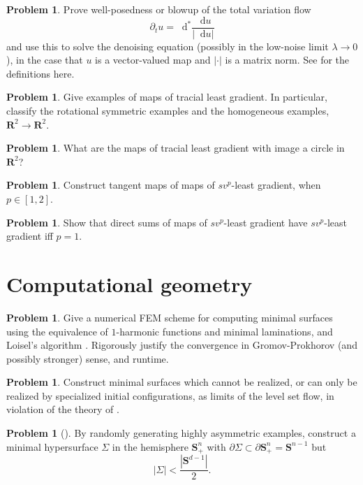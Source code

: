 \documentclass[reqno,11pt]{amsart}
\newcommand{\RR}{\mathbf{R}}
\newcommand{\Sph}{\mathbf S}
\newcommand*\dif{\mathop{}\!\mathrm{d}}
\theoremstyle{definition}
\newtheorem{problem}[theorem]{Problem}
\numberwithin{equation}{section}
\begin{document}
\begin{problem}
Prove well-posedness or blowup of the total variation flow 
$$\partial_t u = \dif^* \frac{\dif u}{|\dif u|}$$
and use this to solve the denoising equation (possibly in the low-noise limit $\lambda \to 0$), in the case that $u$ is a vector-valued map and $|\cdot|$ is a matrix norm.
See \cite{Novaga04} for the definitions here.
\end{problem}

\begin{problem}
Give examples of maps of tracial least gradient.
In particular, classify the rotational symmetric examples and the homogeneous examples, $\RR^2 \to \RR^2$.
\end{problem}

\begin{problem}
What are the maps of tracial least gradient with image a circle in $\RR^2$?
\end{problem}

\begin{problem}
Construct tangent maps of maps of $sv^p$-least gradient, when $p \in [1, 2]$.
\end{problem}

\begin{problem}
Show that direct sums of maps of $sv^p$-least gradient have $sv^p$-least gradient iff $p = 1$.
\end{problem}

\section{Computational geometry}
\begin{problem}
Give a numerical FEM scheme for computing minimal surfaces using the equivalence of $1$-harmonic functions and minimal laminations, and Loisel's algorithm \cite{Loisel20}.
Rigorously justify the convergence in Gromov-Prokhorov (and possibly stronger) sense, and runtime.
\end{problem}

\begin{problem}
Construct minimal surfaces which cannot be realized, or can only be realized by specialized initial configurations, as limits of the level set flow, in violation of the theory of \cite{CHOPP199377}.
\end{problem}

\begin{problem}[{\cite[Conjecture 5.3]{naff2022prescribed}}]
By randomly generating highly asymmetric examples, construct a minimal hypersurface $\Sigma$ in the hemisphere $\Sph^n_+$ with $\partial \Sigma \subset \partial \Sph^n_+ = \Sph^{n - 1}$ but
$$|\Sigma| < \frac{|\Sph^{d - 1}|}{2}.$$
\end{problem}
\end{document}
